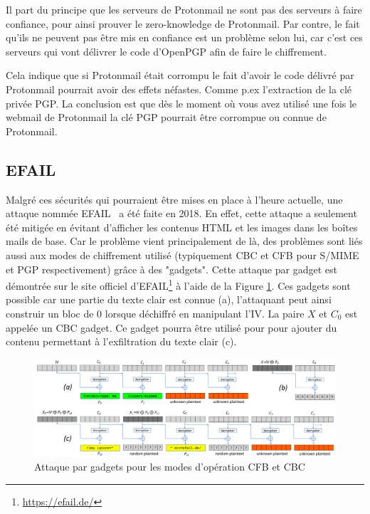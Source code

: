 Il part du principe que les serveurs de Protonmail ne sont pas des serveurs à faire confiance, pour ainsi prouver le zero-knowledge de Protonmail. Par contre, le fait qu'ils ne peuvent pas être mis en confiance est un problème selon lui, car c'est ces serveurs qui vont délivrer le code d'OpenPGP afin de faire le chiffrement.

Cela indique que si Protonmail était corrompu le fait d'avoir le code délivré par Protonmail pourrait avoir des effets néfastes. Comme p.ex l'extraction de la clé privée PGP. La conclusion est que dès le moment où vous avez utilisé une fois le webmail de Protonmail la clé PGP pourrait être corrompue ou connue de Protonmail.
\subsection{EFAIL}
\label{attacks:EFAIL}
Malgré ces sécurités qui pourraient être mises en place à l’heure actuelle, une attaque nommée EFAIL~\cite{conf/uss/PoddebniakD0ISF18} a été faite en 2018. En effet, cette attaque a seulement été mitigée en évitant d’afficher les contenus HTML et les images dans les boîtes mails de base. Car le problème vient principalement de là, des problèmes sont liés aussi aux modes de chiffrement utilisé (typiquement CBC et CFB pour S/MIME et PGP respectivement) grâce à des "gadgets". Cette attaque par gadget est démontrée sur le site officiel d'EFAIL\footnote{\url{https://efail.de/}} à l'aide de la Figure \ref{fig:efailAttack}. Ces gadgets sont possible car une partie du texte clair est connue (a), l'attaquant peut ainsi construir un bloc de 0 lorsque déchiffré en manipulant l'IV. La paire $X$ et $C_0$ est appelée un CBC gadget. Ce gadget pourra être utilisé pour pour ajouter du contenu permettant à l'exfiltration du texte clair (c).

\begin{figure}[h!]
	\includegraphics[width=\textwidth]{images/efail-attack.png}
	\centering
	\caption{Attaque par gadgets pour les modes d'opération CFB et CBC}
	\label{fig:efailAttack}
\end{figure}

